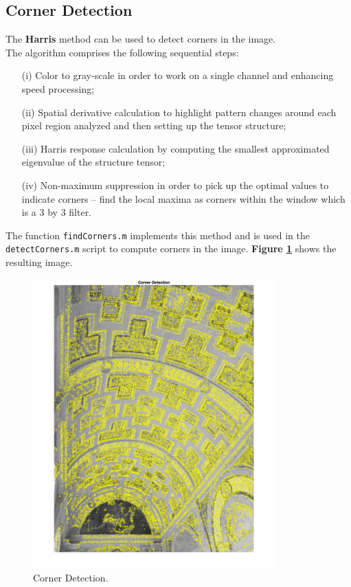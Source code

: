 \documentclass[12pt,a4paper]{article}
\begin{document}
\subsection{Corner Detection}
\label{sec:cornerDetection}
The \textbf{Harris} method can be used to detect corners in the image.\\

The algorithm comprises the following sequential steps:
\begin{itemize}
    \item[(i)] Color to gray-scale in order to work on a single channel and enhancing speed processing;
    \item[(ii)] Spatial derivative calculation to highlight pattern changes around each pixel region analyzed and then setting up the tensor structure;
    \item[(iii)] Harris response calculation by computing the smallest approximated eigenvalue of the structure tensor;
    \item[(iv)] Non-maximum suppression in order to pick up the optimal values to indicate corners -- find the local maxima as corners within the window which is a 3 by 3 filter.
\end{itemize}
\bigskip
The function \verb|findCorners.m| implements this method and is used in the \linebreak \verb|detectCorners.m| script to compute corners in the image. \textbf{Figure \ref{fig:corners}} shows the resulting image.

\begin{figure}[H]
    \centering
    \includegraphics[width=0.83\textwidth]{Images/PalazzoTe_corners.png}
    \caption[Corner Detection.]{Corner Detection.}
    \label{fig:corners}
\end{figure}
\end{document}
